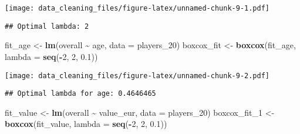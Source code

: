 \documentclass[
]{article}
\newenvironment{Shaded}{\begin{snugshade}}{\end{snugshade}}
\newcommand{\AttributeTok}[1]{\textcolor[rgb]{0.13,0.29,0.53}{#1}}
\newcommand{\DecValTok}[1]{\textcolor[rgb]{0.00,0.00,0.81}{#1}}
\newcommand{\FloatTok}[1]{\textcolor[rgb]{0.00,0.00,0.81}{#1}}
\newcommand{\FunctionTok}[1]{\textcolor[rgb]{0.13,0.29,0.53}{\textbf{#1}}}
\newcommand{\NormalTok}[1]{#1}
\newcommand{\OtherTok}[1]{\textcolor[rgb]{0.56,0.35,0.01}{#1}}
\newcommand{\SpecialCharTok}[1]{\textcolor[rgb]{0.81,0.36,0.00}{\textbf{#1}}}
\newcommand{\StringTok}[1]{\textcolor[rgb]{0.31,0.60,0.02}{#1}}
\begin{document}
\texttt{[image: data\_cleaning\_files/figure-latex/unnamed-chunk-9-1.pdf]}

\begin{Shaded}
\end{Shaded}

\begin{verbatim}
## Optimal lambda: 2
\end{verbatim}

\begin{Shaded}
\begin{Highlighting}[]
\NormalTok{fit\_age }\OtherTok{\textless{}{-}} \FunctionTok{lm}\NormalTok{(overall }\SpecialCharTok{\textasciitilde{}}\NormalTok{ age, }\AttributeTok{data =}\NormalTok{ players\_20)}
\NormalTok{boxcox\_fit }\OtherTok{\textless{}{-}} \FunctionTok{boxcox}\NormalTok{(fit\_age, }\AttributeTok{lambda =} \FunctionTok{seq}\NormalTok{(}\SpecialCharTok{{-}}\DecValTok{2}\NormalTok{, }\DecValTok{2}\NormalTok{, }\FloatTok{0.1}\NormalTok{))}
\end{Highlighting}
\end{Shaded}

\texttt{[image: data\_cleaning\_files/figure-latex/unnamed-chunk-9-2.pdf]}

\begin{Shaded}
\end{Shaded}

\begin{verbatim}
## Optimal lambda for age: 0.4646465
\end{verbatim}

\begin{Shaded}
\begin{Highlighting}[]
\NormalTok{fit\_value }\OtherTok{\textless{}{-}}  \FunctionTok{lm}\NormalTok{(overall }\SpecialCharTok{\textasciitilde{}}\NormalTok{ value\_eur, }\AttributeTok{data =}\NormalTok{ players\_20)}
\NormalTok{boxcox\_fit\_1 }\OtherTok{\textless{}{-}} \FunctionTok{boxcox}\NormalTok{(fit\_value, }\AttributeTok{lambda =} \FunctionTok{seq}\NormalTok{(}\SpecialCharTok{{-}}\DecValTok{2}\NormalTok{, }\DecValTok{2}\NormalTok{, }\FloatTok{0.1}\NormalTok{))}
\end{Highlighting}
\end{Shaded}
\end{document}
